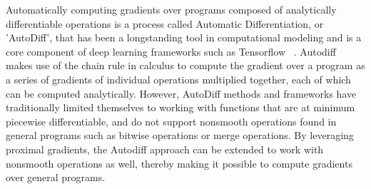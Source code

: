 Automatically computing gradients over programs composed of analytically differentiable operations is a process called Automatic Differentiation, or 'AutoDiff', that has been a longstanding tool in computational modeling and is a core component of deep learning frameworks such as Tensorflow ~\cite{Wengert:1964:SAD:355586.364791, tensorflow2015-whitepaper}. Autodiff makes use of the chain rule in calculus to compute the gradient over a program as a series of gradients of individual operations multiplied together, each of which can be computed analytically. However, AutoDiff methods and frameworks have traditionally limited themselves to working with  functions that are at minimum piecewise differentiable, and do not support nonsmooth operations found in general programs such as bitwise operations or merge operations. By leveraging proximal gradients, the Autodiff approach can be extended to work with nonsmooth operations as well, thereby making it possible to compute gradients over general programs.



